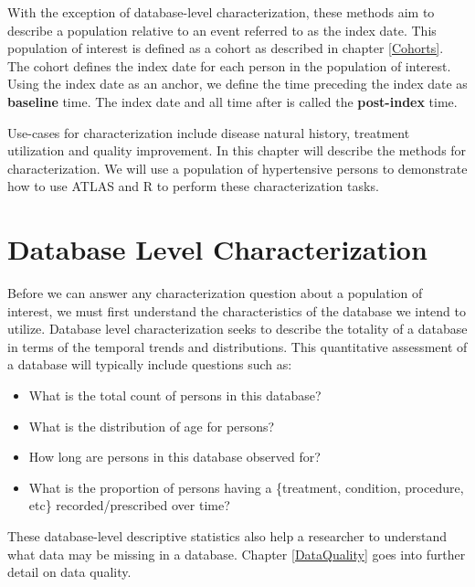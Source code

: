 \documentclass[11pt]{book}
\providecommand{\tightlist}{%
  \setlength{\itemsep}{0pt}\setlength{\parskip}{0pt}}
\theoremstyle{definition}
\theoremstyle{definition}
\theoremstyle{definition}
\theoremstyle{remark}
\begin{document}
With the exception of database-level characterization, these methods aim to describe a population relative to an event referred to as the index date. This population of interest is defined as a cohort as described in chapter \ref{Cohorts}. The cohort defines the index date for each person in the population of interest. Using the index date as an anchor, we define the time preceding the index date as \textbf{baseline} time. The index date and all time after is called the \textbf{post-index} time.

Use-cases for characterization include disease natural history, treatment utilization and quality improvement. In this chapter will describe the methods for characterization. We will use a population of hypertensive persons to demonstrate how to use ATLAS and R to perform these characterization tasks.       

\hypertarget{database-level-characterization}{%
\section{Database Level Characterization}\label{database-level-characterization}}

Before we can answer any characterization question about a population of interest, we must first understand the characteristics of the database we intend to utilize. Database level characterization seeks to describe the totality of a database in terms of the temporal trends and distributions. This quantitative assessment of a database will typically include questions such as:

\begin{itemize}
\tightlist
\item
  What is the total count of persons in this database?
\item
  What is the distribution of age for persons?
\item
  How long are persons in this database observed for?
\item
  What is the proportion of persons having a \{treatment, condition, procedure, etc\} recorded/prescribed over time?
\end{itemize}

These database-level descriptive statistics also help a researcher to understand what data may be missing in a database. Chapter \ref{DataQuality} goes into further detail on data quality. 
\end{document}
